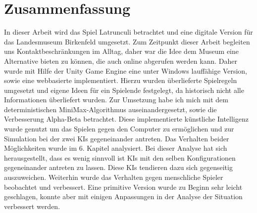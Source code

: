 \chapter*{Zusammenfassung}

In dieser Arbeit wird das Spiel Latrunculi betrachtet und eine digitale Version für das Landesmuseum Birkenfeld umgesetzt. Zum Zeitpunkt dieser Arbeit begleiten uns Kontaktbeschränkungen im Alltag, daher war die Idee dem Museum eine Alternative bieten zu können, die auch online abgerufen werden kann. Daher wurde mit Hilfe der Unity Game Engine eine unter Windows lauffähige Version, sowie eine webbasierte implementiert. Hierzu wurden überlieferte Spielregeln umgesetzt und eigene Ideen für ein Spielende festgelegt, da historisch nicht alle Informationen überliefert wurden. Zur Umsetzung habe ich mich mit dem deterministischen MiniMax-Algorithmus auseinandergesetzt, sowie die Verbesserung Alpha-Beta betrachtet. Diese implementierte künstliche Intelligenz wurde genutzt um das Spielen gegen den Computer zu ermöglichen und zur Simulation bei der zwei KIs gegeneinander antreten. Das Verhalten beider Möglichkeiten wurde im 6. Kapitel analysiert. Bei dieser Analyse hat sich herausgestellt, dass es wenig sinnvoll ist KIs mit den selben Konfigurationen gegeneinander antreten zu lassen. Diese KIs tendieren dazu sich gegenseitig auszuweichen. Weiterhin wurde das Verhalten gegen menschliche Spieler beobachtet und verbessert. Eine primitive Version wurde zu Beginn sehr leicht geschlagen, konnte aber mit einigen Anpassungen in der Analyse der Situation verbessert werden.



